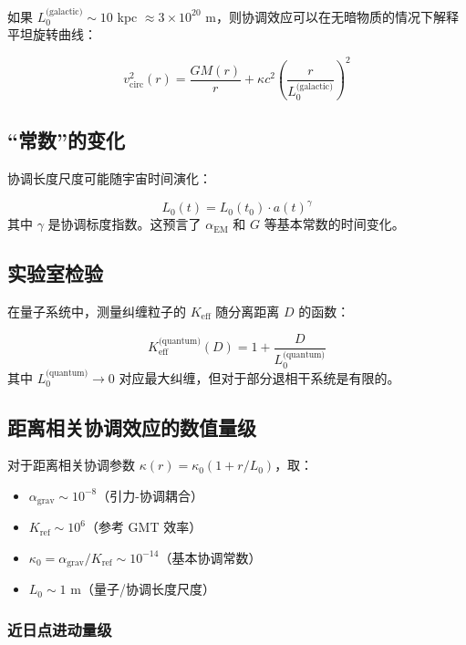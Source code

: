 \documentclass[11pt,a4paper]{article}
\begin{document}
	如果 $L_0^{\text{(galactic)}} \sim 10$ kpc $\approx 3\times10^{20}$ m，则协调效应可以在无暗物质的情况下解释平坦旋转曲线：
	
	\begin{equation}
		v_{\text{circ}}^2(r) = \frac{GM(r)}{r} + \kappa c^2 \left(\frac{r}{L_0^{\text{(galactic)}}}\right)^2
	\end{equation}
	
	\subsection{“常数”的变化}
	
	协调长度尺度可能随宇宙时间演化：
	
	\begin{equation}
		L_0(t) = L_0(t_0) \cdot a(t)^\gamma
	\end{equation}
	其中 $\gamma$ 是协调标度指数。这预言了 $\alpha_{\text{EM}}$ 和 $G$ 等基本常数的时间变化。
	
	\subsection{实验室检验}
	
	在量子系统中，测量纠缠粒子的 $K_{\mathrm{eff}}$ 随分离距离 $D$ 的函数：
	
	\begin{equation}
		K_{\mathrm{eff}}^{\text{(quantum)}}(D) = 1 + \frac{D}{L_0^{\text{(quantum)}}}
	\end{equation}
	其中 $L_0^{\text{(quantum)}} \to 0$ 对应最大纠缠，但对于部分退相干系统是有限的。
	
	\subsection{距离相关协调效应的数值量级}
	\label{subsec:numerical-magnitudes}
	
	对于距离相关协调参数 $\kappa(r) = \kappa_0(1 + r/L_0)$，取：
	\begin{itemize}
		\item $\alpha_{\text{grav}} \sim 10^{-8}$（引力-协调耦合）
		\item $K_{\text{ref}} \sim 10^6$（参考 GMT 效率）
		\item $\kappa_0 = \alpha_{\text{grav}}/K_{\text{ref}} \sim 10^{-14}$（基本协调常数）
		\item $L_0 \sim 1$ m（量子/协调长度尺度）
	\end{itemize}
	
	\subsubsection{近日点进动量级}
	
\end{document}
